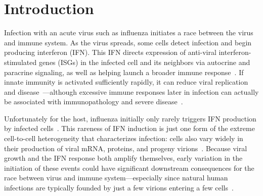 \documentclass[]{asm-article}
\begin{document}
\section{Introduction}
Infection with an acute virus such as influenza initiates a race between the virus and immune system.
As the virus spreads, some cells detect infection and begin producing interferon (IFN).
This IFN directs expression of anti-viral interferon-stimulated genes (ISGs) in the infected cell and its neighbors via autocrine and paracrine signaling, as well as helping launch a broader immune response~\cite{stetson2006type,honda2006type}.
If innate immunity is activated sufficiently rapidly, it can reduce viral replication and disease~\cite{solov1969results,treanor1987intranasally,beilharz2007protection,kugel2009intranasal,steel2010transmission}---although excessive immune responses later in infection can actually be associated with immunopathology and severe disease~\cite{la2007question, iwasaki2014innate}.

Unfortunately for the host, influenza initially only rarely triggers IFN production by infected cells~\cite{kallfass2013visualizing, killip2017single}.
This rareness of IFN induction is just one form of the extreme cell-to-cell heterogeneity that characterizes infection: cells also vary widely in their production of viral mRNA, proteins, and progeny virions~\cite{russell2018extreme,steuerman2018dissection,sjaastad2018distinct,heldt2015single,wang2018cell}.
Because viral growth and the IFN response both amplify themselves, early variation in the initiation of these events could have significant downstream consequences for the race between virus and immune system---especially since natural human infections are typically founded by just a few virions entering a few cells~\cite{mccrone2018stochastic, xue2018reconciling, varble2014influenza}.
\end{document}
